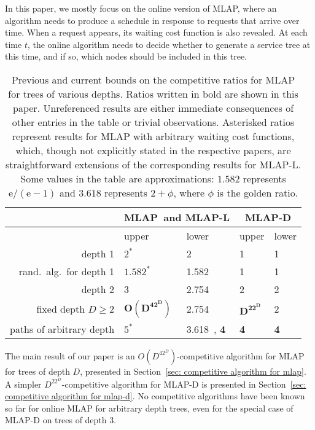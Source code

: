 \documentclass[a4paper]{article}
\newcommand{\MLAP}{\mbox{\rm\textsf{MLAP}}}
\newcommand{\MLAPL}{\mbox\rm{\textsf{MLAP-L}}}
\newcommand{\MLAPD}{\mbox{\rm\textsf{MLAP-D}}}
\begin{document}
In this paper, we mostly focus on the online version of {\MLAP}, where an algorithm needs to
produce a schedule in response to requests that arrive over time.
When a request appears, its waiting cost function is
also revealed. At each time $t$, the online algorithm needs to decide whether to
generate a service tree at this time, and if so, which nodes should be included in this tree.


\begin{table}
\begin{center}
\begin{tabular}{r|l|l|l|l|}
	& \multicolumn{2}{c|}{\MLAP\ and \MLAPL} & \multicolumn{2}{c|}{\MLAPD} \\
\hline
 & upper & lower & upper & lower \\
\hline
depth 1 & $2^*$~\cite{tcp-ack-det-journal} & 2~\cite{tcp-ack-det-journal}
& 1 & 1 \\
rand.~alg.~for depth 1 & $1.582^*$~\cite{tcp-ack} &
1.582~\cite{tcp-ack-lower-bound} &
1 & 1 \\
depth 2 & 3~\cite{jrp-online-buchbinder} & 2.754~\cite{jrp-soda-2014} & 2~\cite{jrp-soda-2014} & 2~\cite{jrp-soda-2014} \\
fixed depth $D \geq 2$ & $\mathbf{O(D^42^D)}$ & 2.754 & $\mathbf{D^22^D}$ & 2 \\
paths of arbitrary depth & $5^*$~\cite{aggregation_wads_2013} & 3.618~\cite{aggregation_wads_2013}, {\bf 4} & {\bf 4} & {\bf 4} \\
\hline
\end{tabular}
\end{center}
\caption{Previous and current bounds on the competitive ratios for {\MLAP} for trees of various depths.
Ratios written in bold are shown in this paper. Unreferenced results are either immediate consequences of
other entries in the table or trivial observations.
Asterisked ratios represent results for {\MLAP} with arbitrary waiting cost functions, which, though
not explicitly stated in the respective papers,  are straightforward extensions of the
corresponding results for {\MLAPL}. Some values in the table are approximations:
$1.582$ represents $\mathrm{e}/(\mathrm{e}-1)$ and $3.618$ represents $2+\phi$, where $\phi$ is the golden ratio.
}
\label{tab:results}
\end{table}

The main result of our paper is an $O(D^42^D)$-competitive algorithm
for {\MLAP} for trees of depth $D$, presented in 
Section~\ref{sec: competitive algorithm for mlap}.  A simpler $D^22^D$-competitive
algorithm for {\MLAPD} is presented in Section~\ref{sec: competitive algorithm for mlap-d}. 
No competitive algorithms have been known so far
for online {\MLAP} for arbitrary depth trees, even for the special case of
{\MLAPD} on trees of depth $3$.
\end{document}
